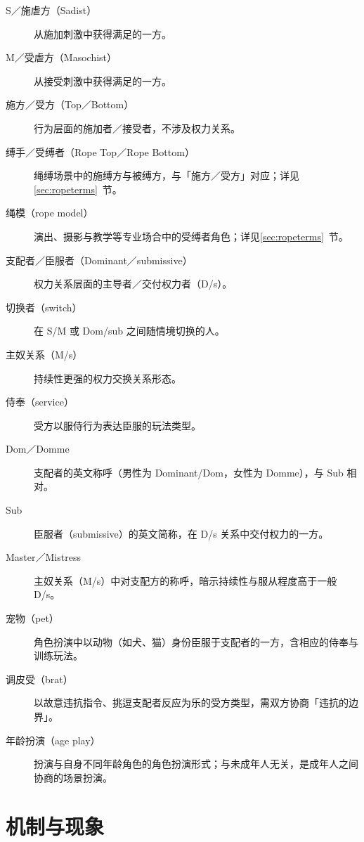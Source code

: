 \documentclass[12pt,UTF8]{ctexbook}
\begin{document}
\begin{description}
\item[S／施虐方（Sadist）] 从施加刺激中获得满足的一方。
\item[M／受虐方（Masochist）] 从接受刺激中获得满足的一方。
\item[施方／受方（Top／Bottom）] 行为层面的施加者／接受者，不涉及权力关系。
\item[缚手／受缚者（Rope Top／Rope Bottom）] 绳缚场景中的施缚方与被缚方，与「施方／受方」对应；详见\ref{sec:ropeterms}~节。
\item[绳模（rope model）] 演出、摄影与教学等专业场合中的受缚者角色；详见\ref{sec:ropeterms}~节。
\item[支配者／臣服者（Dominant／submissive）] 权力关系层面的主导者／交付权力者（D/s）。
\item[切换者（switch）] 在 S/M 或 Dom/sub 之间随情境切换的人。
\item[主奴关系（M/s）] 持续性更强的权力交换关系形态。
\item[侍奉（service）] 受方以服侍行为表达臣服的玩法类型。
\item[Dom／Domme] 支配者的英文称呼（男性为 Dominant/Dom，女性为 Domme），与 Sub 相对。
\item[Sub] 臣服者（submissive）的英文简称，在 D/s 关系中交付权力的一方。
\item[Master／Mistress] 主奴关系（M/s）中对支配方的称呼，暗示持续性与服从程度高于一般 D/s。
\item[宠物（pet）] 角色扮演中以动物（如犬、猫）身份臣服于支配者的一方，含相应的侍奉与训练玩法。
\item[调皮受（brat）] 以故意违抗指令、挑逗支配者反应为乐的受方类型，需双方协商「违抗的边界」。
\item[年龄扮演（age play）] 扮演与自身不同年龄角色的角色扮演形式；与未成年人无关，是成年人之间协商的场景扮演。
\end{description}

\section{机制与现象}
\end{document}
